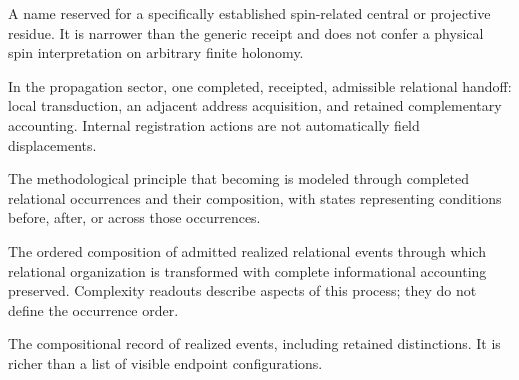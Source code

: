 \begin{description}[style=nextline,leftmargin=1.5em,font=\normalfont\bfseries]
\item[Relational Spin Residue]
A name reserved for a specifically established spin-related central or projective residue. It is narrower than the generic receipt and does not confer a physical spin interpretation on arbitrary finite holonomy.
\item[QR event]
In the propagation sector, one completed, receipted, admissible relational handoff: local transduction, an adjacent address acquisition, and retained complementary accounting. Internal registration actions are not automatically field displacements.
\item[Event primacy]
The methodological principle that becoming is modeled through completed relational occurrences and their composition, with states representing conditions before, after, or across those occurrences.
\item[Becoming]
The ordered composition of admitted realized relational events through which relational organization is transformed with complete informational accounting preserved. Complexity readouts describe aspects of this process; they do not define the occurrence order.
\item[Registered history]
The compositional record of realized events, including retained distinctions. It is richer than a list of visible endpoint configurations.


\end{description}
